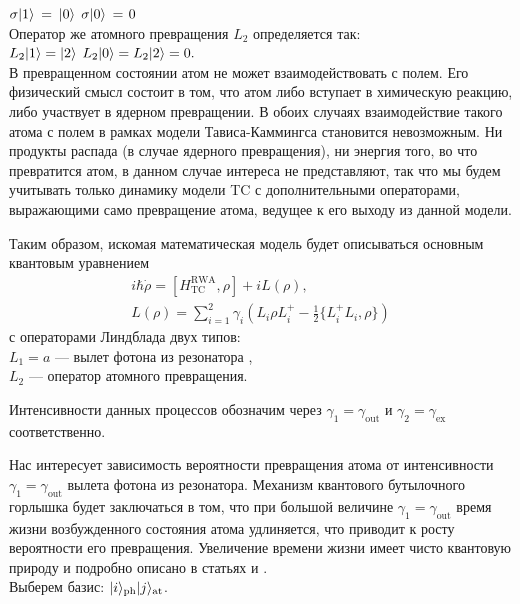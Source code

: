 \hspace{98pt}$\sigma|1\rangle\hspace{2pt}=\hspace{2pt}|0\rangle$
\hspace{98pt}$\sigma|0\rangle\hspace{2pt} = \hspace{1pt}0$\\[12pt]
\noindent Оператор же атомного превращения $L_{2}$ определяется так:\\
\indent\hspace{94pt}$L_{2}|1\rangle = |2\rangle$
\hspace{95pt}$L_{2}|0\rangle = L_{2}|2\rangle = 0.$\\[12pt]
\indent В превращенном состоянии атом не может взаимодействовать с полем. Его физический смысл состоит в том, что атом либо вступает в химическую реакцию, либо участвует в ядерном превращении. В обоих случаях взаимодействие такого атома с полем в рамках модели Тависа-Каммингса становится невозможным. Ни продукты распада (в случае ядерного превращения), ни энергия того, во что превратится атом, в данном случае интереса не представляют, так что мы будем учитывать только динамику модели TC с дополнительными операторами, выражающими само превращение атома, ведущее к его выходу из данной модели.

Таким образом, искомая математическая модель будет описываться основным квантовым уравнением \cite{breuer}
\begin{equation}\label{sec2_master_eq}
\begin{gathered}
	i\hbar\dot\rho = [H_{\text{TC}}^{\text{RWA}}, \rho] + iL(\rho),\\
	L(\rho) = \sum_{i=1}^{2}\gamma_{i}(L_{i}\rho L_{i}^{+} - \frac{1}{2}\{L_{i}^{+}L_{i}, \rho\})
\end{gathered}
\end{equation}
с операторами Линдблада двух типов:\\
\indent\qquad$L_{1} = a$ --- вылет фотона из резонатора \cite{breuer,photon_emission},\\
\indent\qquad$L_{2}$ --- оператор атомного превращения.

\noindent Интенсивности данных процессов обозначим через $\gamma_{1} = \gamma_{\text{out}}$ и $\gamma_{2} = \gamma_{\text{ex}}$ соответственно.

Нас интересует зависимость вероятности превращения атома от интенсивности $\gamma_{1} = \gamma_{\text{out}}$ вылета фотона из резонатора. Механизм квантового бутылочного горлышка будет заключаться в том, что при большой величине $\gamma_{1} = \gamma_{\text{out}}$ время жизни возбужденного состояния атома удлиняется, что приводит к росту вероятности его превращения. Увеличение времени жизни имеет чисто квантовую природу и подробно описано в статьях \cite{quantum_bottleneck_victorova} и \cite{quantum_simulation_homogeneous}.
\\[18pt]
\noindent Выберем базис: $|i\rangle_{\text{ph}}|j\rangle_{\text{at}}$.

